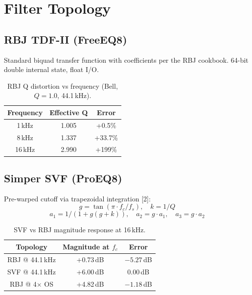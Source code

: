\documentclass[10pt,twocolumn,a4paper]{article}
\begin{document}
\section{Filter Topology}

\subsection{RBJ TDF-II (FreeEQ8)}
Standard biquad transfer function with coefficients per the RBJ cookbook. 64-bit double internal state, float I/O.

\begin{table}[ht]
  \caption{RBJ Q distortion vs frequency (Bell, $Q=1.0$, 44.1\,kHz).}
  \centering
  \begin{tabular}{ccc}\toprule
    Frequency & Effective Q & Error \\\midrule
    1\,kHz & 1.005 & +0.5\% \\
    8\,kHz & 1.337 & +33.7\% \\
    16\,kHz & 2.990 & +199\% \\\bottomrule
  \end{tabular}
  \label{tab:qdistortion}
\end{table}

\subsection{Simper SVF (ProEQ8)}
Pre-warped cutoff via trapezoidal integration [2]:
\begin{equation}
g = \tan(\pi \cdot f_c / f_s), \quad k = 1/Q
\end{equation}
\begin{equation}
a_1 = 1 / (1 + g(g + k)), \quad a_2 = g \cdot a_1, \quad a_3 = g \cdot a_2
\end{equation}

\begin{table}[ht]
  \caption{SVF vs RBJ magnitude response at 16\,kHz.}
  \centering
  \begin{tabular}{ccc}\toprule
    Topology & Magnitude at $f_c$ & Error \\\midrule
    RBJ @ 44.1\,kHz & +0.73\,dB & $-5.27$\,dB \\
    SVF @ 44.1\,kHz & +6.00\,dB & 0.00\,dB \\
    RBJ @ 4$\times$ OS & +4.82\,dB & $-1.18$\,dB \\\bottomrule
  \end{tabular}
  \label{tab:svfvsrbj}
\end{table}
\end{document}
